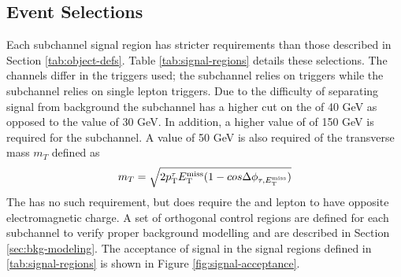 
		\subsection{Event Selections}\label{ssec:event-selection}
			Each subchannel signal region has stricter requirements than those described in Section \ref{tab:object-defs}. Table \ref{tab:signal-regions} details these selections. The channels differ in the triggers used; the \taujets subchannel relies on \Etm triggers while the \taulep subchannel relies on single lepton triggers. Due to the difficulty of separating signal from background the \taujets subchannel has a higher \pt cut on the \tauhad of 40 GeV as opposed to the \taulep value of 30 GeV. In addition, a higher value of \Etm of 150 GeV is required for the \taujets subchannel. A value of 50 GeV is also required of the transverse mass $m_{T}$ defined as 
			\begin{equation}\label{eqn:transverse-mass}
			m_{T} = \sqrt{ 2 p_{\text{T}}^{\tau} E_\text{T}^\text{miss} (1 - cos \Delta \phi_{\tau,E_\text{T}^\text{miss}}) }
			\end{equation}
			The \taulep has no such requirement, but does require the \tauhad and lepton to have opposite electromagnetic charge. A set of orthogonal control regions are defined for each subchannel to verify proper background modelling and are described in Section \ref{sec:bkg-modeling}. The acceptance of signal in the signal regions defined in \ref{tab:signal-regions} is shown in Figure \ref{fig:signal-acceptance}.


